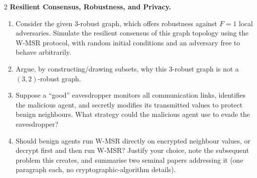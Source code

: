 \documentclass[a4paper, 11pt]{article}
\begin{document}
\begin{problem}{2}
\textbf{Resilient Consensus, Robustness, and Privacy.}
\begin{enumerate}
    \item[2.1] Consider the given 3-robust graph, which offers robustness against $F=1$ local adversaries. Simulate the resilient consensus of this graph topology using the W-MSR protocol, with random initial conditions and an adversary free to behave arbitrarily.
    \item[2.2] Argue, by constructing/drawing subsets, why this 3-robust graph is not a $(3,2)$-robust graph.
    \item[2.3] Suppose a ``good'' eavesdropper monitors all communication links, identifies the malicious agent, and secretly modifies its transmitted values to protect benign neighbours. What strategy could the malicious agent use to evade the eavesdropper?
    \item[2.4] Should benign agents run W-MSR directly on encrypted neighbour values, or decrypt first and then run W-MSR? Justify your choice, note the subsequent problem this creates, and summarise two seminal papers addressing it (one paragraph each, no cryptographic-algorithm details).
\end{enumerate}
\end{problem}
\end{document}
